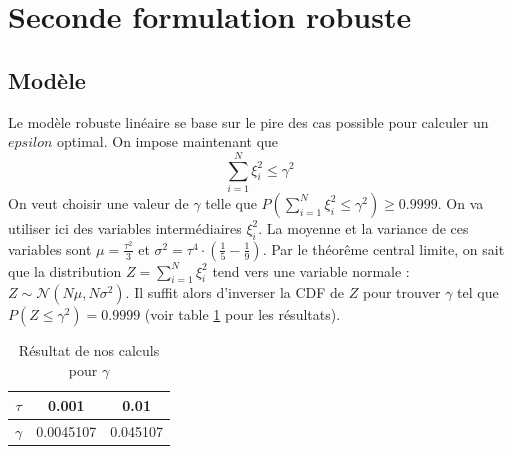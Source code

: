 \section{Seconde formulation robuste}
\subsection{Modèle}
Le modèle robuste linéaire se base sur le pire des cas possible pour calculer un $epsilon$ optimal. On impose maintenant que
$$\sum_{i=1}^N \xi_i^2 \leq \gamma^2$$
On veut choisir une valeur de $\gamma$ telle que $P(\sum_{i=1}^N \xi_i^2 \leq \gamma^2)\geq 0.9999$. On va utiliser ici des variables intermédiaires $\xi_i^2$. La moyenne et la variance de ces variables sont $\mu = \frac{\tau^2}{3}$ et $\sigma^2 = \tau^4\cdot(\frac{1}{5}-\frac{1}{9})$.
Par le théorême central limite, on sait que la distribution $Z = \sum_{i=1}^N \xi_i^2$ tend vers une variable normale : $Z\sim \mathcal{N}(N\mu, N\sigma^2)$. Il suffit alors d'inverser la CDF de $Z$ pour trouver $\gamma$ tel que $P(Z\leq \gamma^2)=0.9999$ (voir table \ref{gamma} pour les résultats).
\begin{table}
\centering
\begin{tabular}{|c|c|c|}
\hline
$\tau$ & 0.001 & 0.01 \\
\hline
$\gamma$ & 0.0045107 & 0.045107 \\
\hline
\end{tabular}
\caption{Résultat de nos calculs pour $\gamma$}
\label{gamma}
\end{table}

